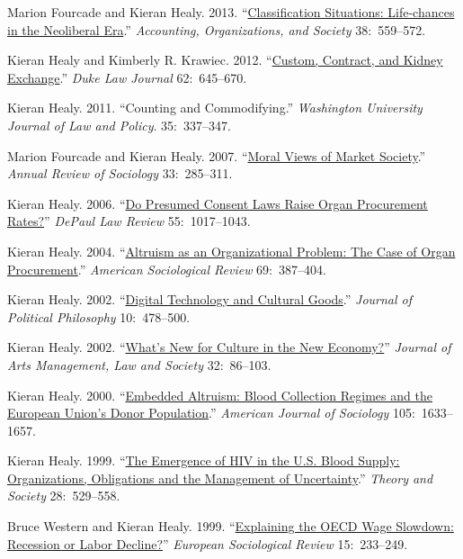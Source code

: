\documentclass[11pt,article,oneside]{memoir}
\begin{document}
\ind Marion Fourcade and Kieran Healy. 2013. ``\href{http://kieranhealy.org/files/papers/classification-situations.pdf}{Classification Situations: Life-chances in the Neoliberal Era}.'' \emph{Accounting, Organizations, and Society} 38:~559--572.

\ind Kieran Healy and Kimberly R. Krawiec. 2012. ``\href{http://kieranhealy.org/files/papers/custom-contract-kidney.pdf}{Custom, Contract, and Kidney Exchange}.'' \emph{Duke Law Journal} 62:~645--670. 

\ind Kieran Healy. 2011. ``Counting and Commodifying.'' \emph{Washington University Journal of Law and Policy}. 35:~337--347.

\ind Marion Fourcade and Kieran Healy. 2007. ``\href{http://arjournals.annualreviews.org/doi/pdf/10.1146/annurev.soc.33.040406.131642}{Moral Views of Market Society}.'' \emph{Annual Review of Sociology} 33:~285--311. 

\ind Kieran Healy. 2006. ``\href{http://www.kieranhealy.org/files/papers/presumed-consent.pdf}{Do Presumed Consent Laws Raise Organ Procurement Rates?}'' \emph{DePaul Law Review} 55:~1017--1043. 

\ind Kieran Healy. 2004. ``\href{http://www.kieranhealy.org/files/papers/asr2004.pdf}{Altruism as an Organizational Problem: The Case of Organ Procurement}.''
 \emph{American Sociological Review} 69:~387--404.

\ind Kieran Healy. 2002. ``\href{http://www.kieranhealy.org/files/papers/jpp.pdf}{Digital Technology and Cultural Goods}.'' \emph{Journal of
  Political Philosophy} 10:~478--500. 

\ind Kieran Healy. 2002. ``\href{http://www.kieranhealy.org/files/papers/culture-newecon.pdf}{What's New for Culture in the New Economy?}'' \emph{Journal
  of Arts Management, Law and Society} 32:~86--103. 


\ind Kieran Healy. 2000. ``\href{http://www.kieranhealy.org/files/papers/embed-alt.pdf}{Embedded Altruism: Blood Collection Regimes and the European
  Union's Donor Population}.'' \emph{American Journal of Sociology} 105:~1633--1657.


\ind Kieran Healy. 1999.  ``\href{http://www.kieranhealy.org/files/papers/ts.pdf}{The Emergence of HIV in the U.S. Blood Supply: Organizations,
  Obligations and the Management of Uncertainty}.'' \emph{Theory and Society} 28:~529--558.


\ind Bruce Western and Kieran Healy. 1999. ``\href{http://www.kieranhealy.org/files/papers/western-healy99.pdf}{Explaining the OECD Wage Slowdown:
Recession or Labor Decline?}''  \emph{European Sociological Review}
15:~233--249.
\end{document}
